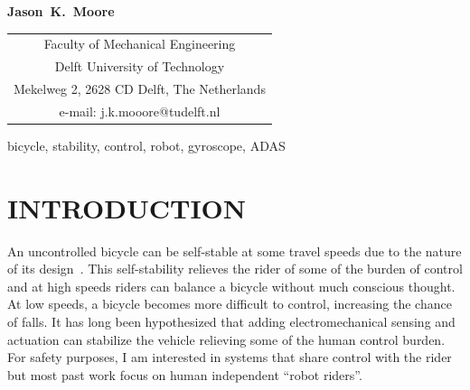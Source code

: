 \documentclass{icsc}
\begin{document}
\begin{center}
\end{center}

\begin{center}
  \normalsize{\bf{Jason~K.~Moore}}
\end{center}

\begin{center}
  \begin{tabular}{c}
    Faculty of Mechanical Engineering\\
    Delft University of Technology\\
    Mekelweg 2, 2628 CD Delft, The Netherlands\\
    e-mail: j.k.mooore@tudelft.nl\\
  \end{tabular}
\end{center}

\begin{keywords}
  bicycle,
  stability,
  control,
  robot,
  gyroscope,
  ADAS
\end{keywords}

\section{INTRODUCTION}
%
An uncontrolled bicycle can be self-stable at some travel speeds due to the
nature of its design~\cite{Meijaard2007a}. This self-stability relieves the
rider of some of the burden of control and at high speeds riders can balance a
bicycle without much conscious thought. At low speeds, a bicycle becomes more
difficult to control, increasing the chance of falls. It has long been
hypothesized that adding electromechanical sensing and actuation can stabilize
the vehicle relieving some of the human control burden. For safety purposes, I
am interested in systems that share control with the rider but most past work
focus on human independent ``robot riders''.
\end{document}
